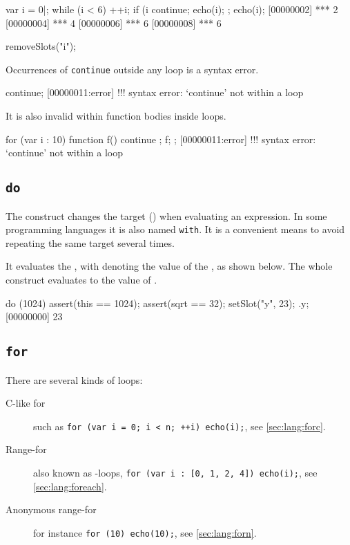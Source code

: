 \begin{urbiscript}
var i = 0|;
while (i < 6)
{
  ++i;
  if (i %
    continue;
  echo(i);
};
echo(i);
[00000002] *** 2
[00000004] *** 4
[00000006] *** 6
[00000008] *** 6
\end{urbiscript}
\begin{urbicomment}
removeSlots("i");
\end{urbicomment}

Occurrences of \lstinline{continue} outside any loop is a syntax error.

\begin{urbiscript}
continue;
[00000011:error] !!! syntax error: `continue' not within a loop
\end{urbiscript}

It is also invalid within function bodies inside loops.

\begin{urbiscript}
for (var i : 10)
{
  function f() { continue };
  f;
};
[00000011:error] !!! syntax error: `continue' not within a loop
\end{urbiscript}

\subsection{\lstinline{do}}
\label{sec:lang:do}

The  construct changes the target (\this) when evaluating an
expression.  In some programming languages it is also named
\lstinline{with}.  It is a convenient means to avoid repeating the same
target several times.


It evaluates the , with \this denoting the value of the
, as shown below.  The whole construct evaluates to the
value of .

\begin{urbiscript}
do (1024)
{
  assert(this == 1024);
  assert(sqrt == 32);
  setSlot("y", 23);
}.y;
[00000000] 23
\end{urbiscript}


\subsection{\lstinline{for}}
\label{sec:lang:for}

There are several kinds of  loops:
\begin{description}
\item[C-like for] such as
  \lstinline|for (var i = 0; i < n; ++i) echo(i);|, see
  \autoref{sec:lang:forc}.
\item[Range-for] also known as -loops,
  \lstinline|for (var i : [0, 1, 2, 4]) echo(i);|, see
  \autoref{sec:lang:foreach}.
\item[Anonymous range-for] for instance \lstinline|for (10) echo(10);|, see
  \autoref{sec:lang:forn}.
\end{description}

